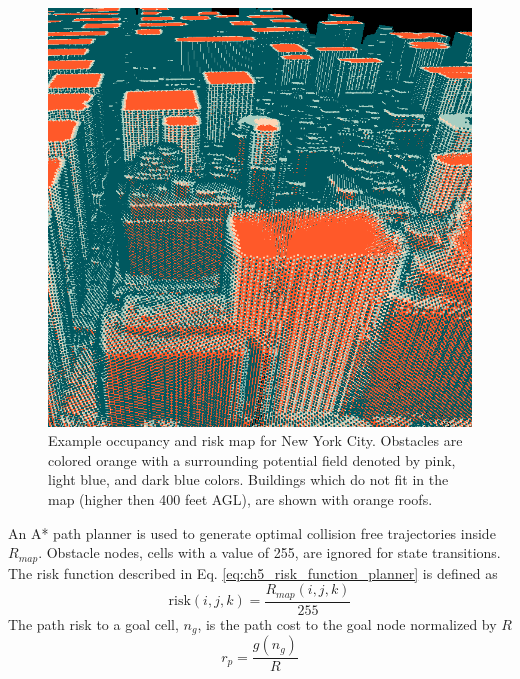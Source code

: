 \begin{figure}[ht]
  \centering
  \includegraphics[width=0.5\linewidth]{chapter_5_mapping/imgs/voxel_map_ny_2.png}
  \caption[Occupancy map of New York City]{Example occupancy and risk map for New York City. Obstacles are colored orange with a surrounding potential field denoted by pink, light blue, and dark blue colors. Buildings which do not fit in the map (higher then 400 feet AGL), are shown with orange roofs.}
  \label{fig:ch5_ny_voxel_map}
\end{figure}

An A* path planner is used to generate optimal collision free trajectories inside $R_{map}$. Obstacle nodes, cells with a value of 255, are ignored for state transitions. The risk function described in Eq. \ref{eq:ch5_risk_function_planner} is defined as
\begin{equation}
\text{risk}(i,j,k) = \frac{R_{map}(i,j,k )}{255} 
\end{equation}
The path risk to a goal cell, $n_g$, is the path cost to the goal node normalized by $R$
\begin{equation}
r_p = \frac{g(n_g)}{R} 
\end{equation}




